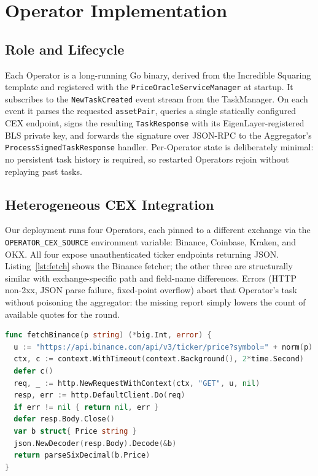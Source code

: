 \section{Operator Implementation}
\label{sec:operator}

\subsection{Role and Lifecycle}

Each Operator is a long-running Go binary, derived from the
Incredible Squaring template and registered with the
\texttt{PriceOracleServiceManager} at startup.  It subscribes to the
\texttt{NewTaskCreated} event stream from the TaskManager.  On each
event it parses the requested \texttt{assetPair}, queries a single
statically configured CEX endpoint, signs the resulting
\texttt{TaskResponse} with its EigenLayer-registered BLS private key,
and forwards the signature over JSON-RPC to the Aggregator's
\texttt{ProcessSignedTaskResponse} handler.  Per-Operator state is
deliberately minimal: no persistent task history is required, so
restarted Operators rejoin without replaying past tasks.

\subsection{Heterogeneous CEX Integration}

Our deployment runs four Operators, each pinned to a different
exchange via the \texttt{OPERATOR\_CEX\_SOURCE} environment variable:
Binance, Coinbase, Kraken, and OKX.  All four expose unauthenticated
ticker endpoints returning JSON.  Listing~\ref{lst:fetch} shows the
Binance fetcher; the other three are structurally similar with
exchange-specific path and field-name differences.  Errors (HTTP
non-2xx, JSON parse failure, fixed-point overflow) abort that
Operator's task without poisoning the aggregator: the missing
report simply lowers the count of available quotes for the round.

\begin{lstlisting}[language=Go, caption={CEX price fetcher (Binance).}, label={lst:fetch}]
func fetchBinance(p string) (*big.Int, error) {
  u := "https://api.binance.com/api/v3/ticker/price?symbol=" + norm(p)
  ctx, c := context.WithTimeout(context.Background(), 2*time.Second)
  defer c()
  req, _ := http.NewRequestWithContext(ctx, "GET", u, nil)
  resp, err := http.DefaultClient.Do(req)
  if err != nil { return nil, err }
  defer resp.Body.Close()
  var b struct{ Price string }
  json.NewDecoder(resp.Body).Decode(&b)
  return parseSixDecimal(b.Price)
}
\end{lstlisting}


